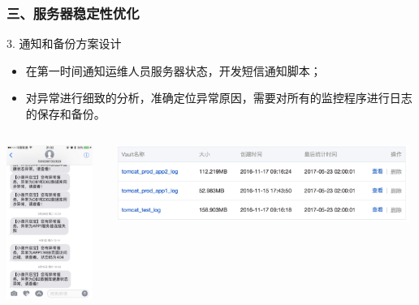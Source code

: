 \documentclass{beamer}
\begin{document}
\begin{frame}
\frametitle{三、服务器稳定性优化}
  \begin{block}{3. 通知和备份方案设计}
    \begin{itemize}
      \item 在第一时间通知运维人员服务器状态，开发短信通知脚本；
      \item 对异常进行细致的分析，准确定位异常原因，需要对所有的监控程序进行日志的保存和备份。
    \end{itemize}
  \end{block}
  \begin{columns}
    \begin{column}{0.30\textwidth}
      \centering
      \includegraphics[height=5cm]{./img/03/message.jpg}
    \end{column}
    \begin{column}{0.70\textwidth}
      \includegraphics[height=2.5cm]{./img/03/aliyun3.png}
    \end{column}
  \end{columns}
\end{frame}
\end{document}
